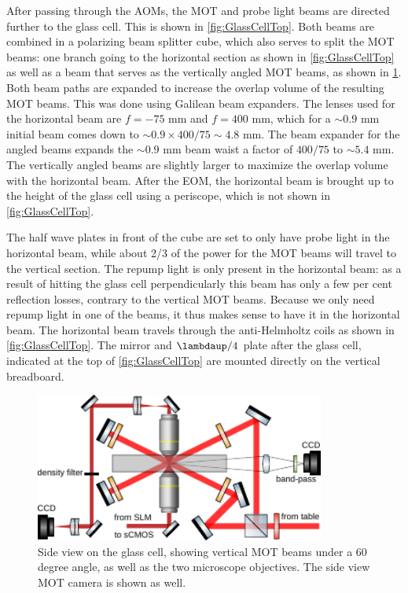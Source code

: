 After passing through the AOMs, the MOT and probe light beams are directed further to the glass cell. 
This is shown in \cref{fig:GlassCellTop}.
Both beams are combined in a polarizing beam splitter cube, which also serves to split the MOT beams: one branch going to the horizontal section as shown in \cref{fig:GlassCellTop} as well as a beam that serves as the vertically angled MOT beams, as shown in \cref{fig:GlassCellSide}. 
Both beam paths are expanded to increase the overlap volume of the resulting MOT beams.
This was done using Galilean beam expanders. 
The lenses used for the horizontal beam are $f=-75$ mm and $f=400$ mm, which for a $\sim 0.9$ mm initial beam comes down to $\sim 0.9 \times 400/75 \sim 4.8$ mm.
The beam expander for the angled beams expands the $\sim0.9$ mm beam waist a factor of $400/75$ to $\sim5.4$ mm.
The vertically angled beams are slightly larger to maximize the overlap volume with the horizontal beam.
After the EOM, the horizontal beam is brought up to the height of the glass cell using a periscope, which is not shown in \cref{fig:GlassCellTop}.

The half wave plates in front of the cube are set to only have probe light in the horizontal beam, while about 2/3 of the power for the MOT beams will travel to the vertical section. 
The repump light is only present in the horizontal beam: as a result of hitting the glass cell perpendicularly this beam has only a few per cent reflection losses, contrary to the vertical MOT beams. 
Because we only need repump light in one of the beams, it thus makes sense to have it in the horizontal beam.
The horizontal beam travels through the anti-Helmholtz coils as shown in \cref{fig:GlassCellTop}.
The mirror and $\lambdaup/4$ plate after the glass cell, indicated at the top of \cref{fig:GlassCellTop} are mounted directly on the vertical breadboard. 


\begin{figure}
    \centering
    \includegraphics[width=0.85\textwidth]{figures/MOTsideview.pdf}
    \caption{Side view on the glass cell, showing vertical MOT beams under a 60 degree angle, as well as the two microscope objectives. 
    The side view MOT camera is shown as well.}
    \label{fig:GlassCellSide}
\end{figure}



